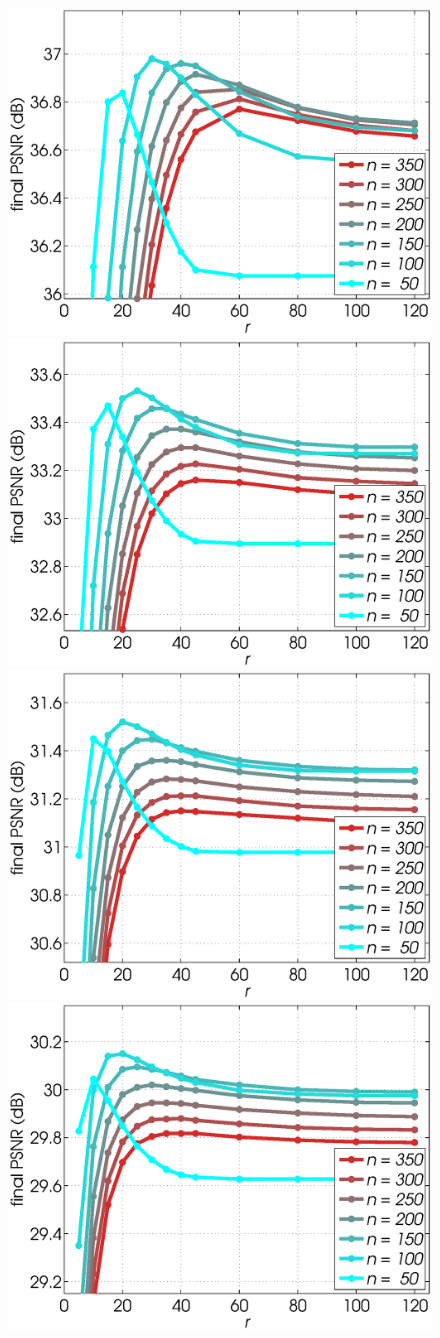 \documentclass[10pt, journal, twocolumn, final, a4paper]{IEEEtran}
\begin{document}
\begin{figure}[htpb!]
	\begin{center}
		\includegraphics[width=.25\textwidth]{figs/params_tables/fpsnr_r2-np2-curves_s10_average_derf_neg-weights.eps}%
		\includegraphics[width=.25\textwidth]{figs/params_tables/fpsnr_r2-np2-curves_s20_average_derf_neg-weights.eps}%
		\includegraphics[width=.25\textwidth]{figs/params_tables/fpsnr_r2-np2-curves_s30_average_derf_neg-weights.eps}%
		\includegraphics[width=.25\textwidth]{figs/params_tables/fpsnr_r2-np2-curves_s40_average_derf_neg-weights.eps}\\


\end{center}
\end{figure}
\end{document}
